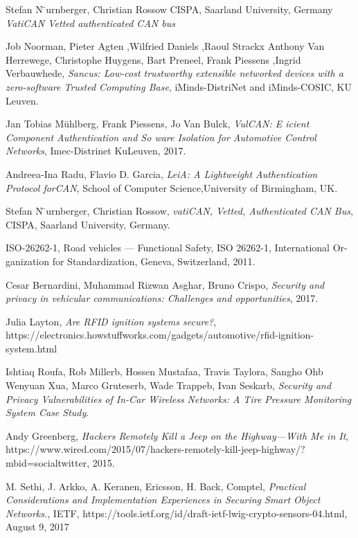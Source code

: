\documentclass[11pt]{article}
\begin{document}
\begin{thebibliography}{10}
	Stefan N ̈urnberger, Christian Rossow
	CISPA, Saarland University, Germany
	\textit{VatiCAN Vetted authenticated CAN bus}
	
	Job Noorman, Pieter Agten ,Wilfried Daniels ,Raoul Strackx
	Anthony Van Herrewege, Christophe Huygens, Bart Preneel, Frank Piessens
    ,Ingrid Verbauwhede, \textit{Sancus: Low-cost trustworthy extensible networked devices with a zero-software Trusted Computing Base}, iMinds-DistriNet and iMinds-COSIC, KU Leuven.
    
    Jan Tobias Mühlberg, Frank Piessens, Jo Van Bulck,
    \textit{VulCAN: E icient Component Authentication and So ware Isolation for Automotive Control Networks}, Imec-Distrinet KuLeuven, 2017.
    
    Andreea-Ina Radu, Flavio D. Garcia,
    \textit{LeiA: A Lightweight Authentication Protocol forCAN},
    School of Computer Science,University of Birmingham, UK.
    
    Stefan N ̈urnberger, Christian Rossow,
    \textit{vatiCAN, Vetted, Authenticated CAN Bus},
	CISPA, Saarland University, Germany.
	
	ISO-26262-1, Road vehicles — Functional Safety, ISO 26262-1, International Or- ganization for Standardization, Geneva, Switzerland, 2011.
	
	Cesar Bernardini, Muhammad Rizwan Asghar, Bruno Crispo,
	\textit{Security and privacy in vehicular communications: Challenges and opportunities}, 2017.
	
	Julia Layton, \textit{Are RFID ignition systems secure?}, https://electronics.howstuffworks.com/gadgets/automotive/rfid-ignition-system.html
	
	Ishtiaq Roufa, Rob Millerb, Hossen Mustafaa, Travis Taylora, Sangho Ohb
	Wenyuan Xua, Marco Gruteserb, Wade Trappeb, Ivan Seskarb, \textit{Security and Privacy Vulnerabilities of In-Car Wireless Networks: A Tire Pressure Monitoring System Case Study}.
	
	Andy Greenberg, \textit{Hackers Remotely Kill a Jeep on the Highway—With Me in It}, https://www.wired.com/2015/07/hackers-remotely-kill-jeep-highway/?mbid=social\textunderscore twitter, 2015.
	
	M. Sethi, J. Arkko, A. Keranen, Ericsson, H. Back, Comptel, 
	\textit{Practical Considerations and Implementation Experiences in Securing Smart Object Networks.},
	IETF, https://tools.ietf.org/id/draft-ietf-lwig-crypto-sensors-04.html, 
	August 9, 2017

	
\end{thebibliography}
\end{document}
